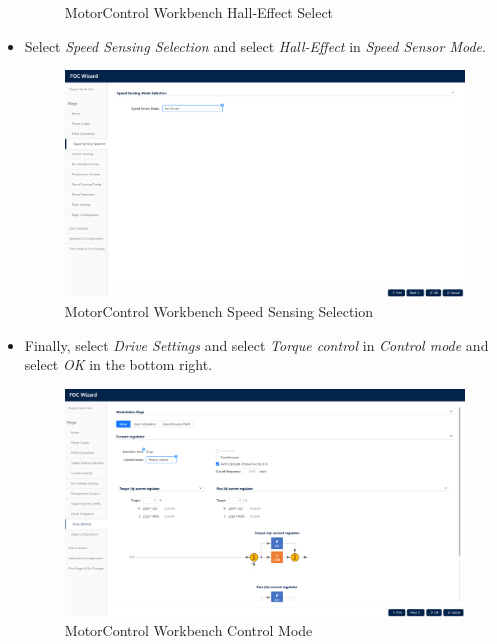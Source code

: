 \documentclass[10pt]{article}
\begin{document}
\begin{itemize}
\begin{figure}[H]
                        \caption{MotorControl Workbench Hall-Effect Select}
                    \end{figure}
                \item Select \emph{Speed Sensing Selection} and select \emph{Hall-Effect} in \emph{Speed Sensor Mode}.
                    \begin{figure}[H]
                        \centerline{\includegraphics[width=\textwidth]{References/MCW FOC Speed Sensing Selection.png}}
                        \caption{MotorControl Workbench Speed Sensing Selection}
                    \end{figure}
                \item Finally, select \emph{Drive Settings} and select \emph{Torque control} in \emph{Control mode} and select \emph{OK} in the bottom right.
                    \begin{figure}[H]
                        \centerline{\includegraphics[width=\textwidth]{References/MCW FOC Control Mode.png}}
                        \caption{MotorControl Workbench Control Mode}
                    \end{figure}

\end{itemize}
\end{document}
